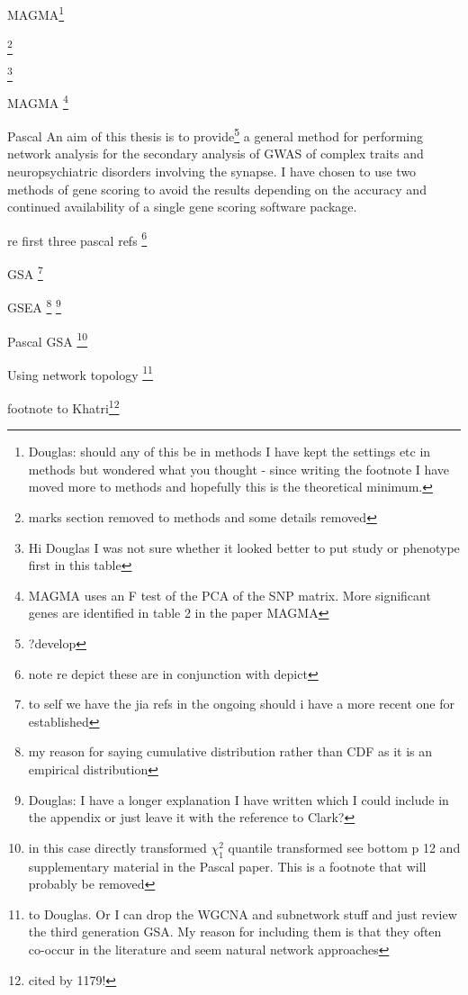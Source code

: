 MAGMA\footnote{ Douglas: should any of this be in methods I have kept the settings etc in methods but wondered what you thought - since writing the footnote I have moved more to methods and hopefully this is the theoretical minimum.}


\footnote{marks section removed to methods and some details removed} 
 

\footnote{Hi Douglas I was not sure whether it looked better to put study or phenotype first in this table} 

MAGMA \footnote{MAGMA uses an F test of the PCA of the SNP matrix. More significant genes are identified in table 2 in the paper MAGMA}


Pascal
An aim of this thesis is to provide\footnote{?develop} a general method for performing network analysis for the secondary analysis of GWAS of complex traits and neuropsychiatric disorders involving the synapse. I have chosen to use two methods of gene scoring to avoid the results depending on the accuracy and continued availability of a single gene scoring software package.


re first three pascal refs
\footnote{note re depict these are in conjunction with depict}

GSA
\footnote{to self we have the jia refs in the ongoing should i have a more recent one for established} 

GSEA
\footnote{my reason for saying  cumulative distribution rather than CDF as it is an empirical distribution}
\footnote{Douglas: I have a longer explanation I have written which I could include in the appendix or just leave it with the reference to Clark?}

Pascal GSA
\footnote{in this case directly transformed $\chi_1^2$ quantile transformed see bottom p 12 and supplementary material in the Pascal paper. This is a footnote that will probably be removed} 

Using network topology
 \footnote{to Douglas. Or I can drop the WGCNA and subnetwork stuff and just review the third generation GSA. My reason for including them is that they often co-occur in the literature and seem natural network approaches}
 
 footnote to Khatri\footnote{cited by 1179!}